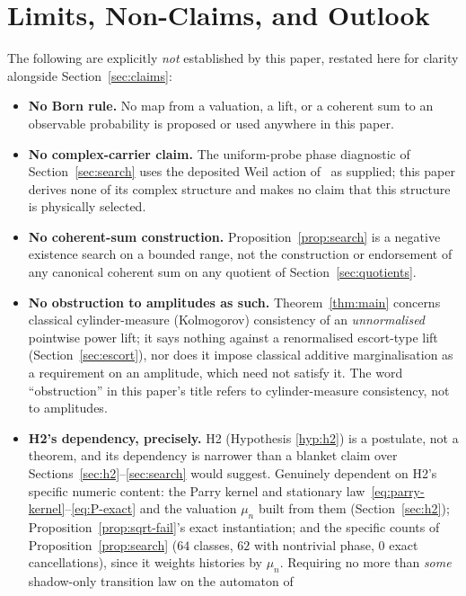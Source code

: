 \documentclass[11pt,a4paper]{article}
\theoremstyle{definition}
\theoremstyle{remark}
\begin{document}
\section{Limits, Non-Claims, and Outlook}
\label{sec:outlook}

The following are explicitly \emph{not} established by this paper, restated here for
clarity alongside Section~\ref{sec:claims}:

\begin{itemize}
  \item \textbf{No Born rule.} No map from a valuation, a lift, or a coherent sum to an
  observable probability is proposed or used anywhere in this paper.
  \item \textbf{No complex-carrier claim.} The uniform-probe phase diagnostic of
  Section~\ref{sec:search} uses the deposited Weil action of~\cite{Beau2026tb} as
  supplied; this paper derives none of its complex structure and makes no claim that
  this structure is physically selected.
  \item \textbf{No coherent-sum construction.} Proposition~\ref{prop:search} is a
  negative existence search on a bounded range, not the construction or endorsement of
  any canonical coherent sum on any quotient of Section~\ref{sec:quotients}.
  \item \textbf{No obstruction to amplitudes as such.} Theorem~\ref{thm:main} concerns
  classical cylinder-measure (Kolmogorov) consistency of an \emph{unnormalised}
  pointwise power lift; it says nothing against a renormalised escort-type lift
  (Section~\ref{sec:escort}), nor does it impose classical additive marginalisation as a
  requirement on an amplitude, which need not satisfy it. The word ``obstruction'' in
  this paper's title refers to cylinder-measure consistency, not to amplitudes.
  \item \textbf{\textup{H2}'s dependency, precisely.} \textup{H2} (Hypothesis
  \ref{hyp:h2}) is a postulate, not a theorem, and its dependency is narrower than a
  blanket claim over Sections~\ref{sec:h2}--\ref{sec:search} would suggest. Genuinely
  dependent on \textup{H2}'s specific numeric content: the Parry kernel and stationary
  law~\eqref{eq:parry-kernel}--\eqref{eq:P-exact} and the valuation $\mu_n$ built from
  them (Section~\ref{sec:h2}); Proposition~\ref{prop:sqrt-fail}'s exact instantiation;
  and the specific counts of Proposition~\ref{prop:search} ($64$ classes, $62$ with
  nontrivial phase, $0$ exact cancellations), since it weights histories by $\mu_n$.
  Requiring no more than \emph{some} shadow-only transition law on the automaton of

\end{itemize}
\end{document}
